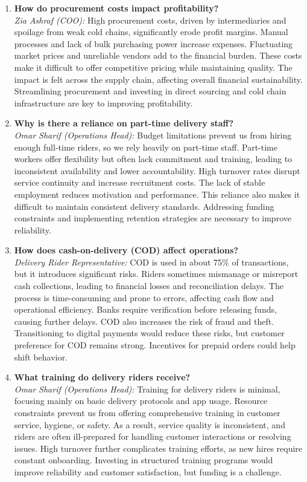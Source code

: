 \documentclass[12pt,a4paper]{article}
\begin{document}
\begin{enumerate}
        \item \textbf{How do procurement costs impact profitability?} \\
        \textit{Zia Ashraf (COO):} High procurement costs, driven by intermediaries and spoilage from weak cold chains, significantly erode profit margins. Manual processes and lack of bulk purchasing power increase expenses. Fluctuating market prices and unreliable vendors add to the financial burden. These costs make it difficult to offer competitive pricing while maintaining quality. The impact is felt across the supply chain, affecting overall financial sustainability. Streamlining procurement and investing in direct sourcing and cold chain infrastructure are key to improving profitability.

        \item \textbf{Why is there a reliance on part-time delivery staff?} \\
        \textit{Omar Sharif (Operations Head):} Budget limitations prevent us from hiring enough full-time riders, so we rely heavily on part-time staff. Part-time workers offer flexibility but often lack commitment and training, leading to inconsistent availability and lower accountability. High turnover rates disrupt service continuity and increase recruitment costs. The lack of stable employment reduces motivation and performance. This reliance also makes it difficult to maintain consistent delivery standards. Addressing funding constraints and implementing retention strategies are necessary to improve reliability.

        \item \textbf{How does cash-on-delivery (COD) affect operations?} \\
        \textit{Delivery Rider Representative:} COD is used in about 75\% of transactions, but it introduces significant risks. Riders sometimes mismanage or misreport cash collections, leading to financial losses and reconciliation delays. The process is time-consuming and prone to errors, affecting cash flow and operational efficiency. Banks require verification before releasing funds, causing further delays. COD also increases the risk of fraud and theft. Transitioning to digital payments would reduce these risks, but customer preference for COD remains strong. Incentives for prepaid orders could help shift behavior.

        \item \textbf{What training do delivery riders receive?} \\
        \textit{Omar Sharif (Operations Head):} Training for delivery riders is minimal, focusing mainly on basic delivery protocols and app usage. Resource constraints prevent us from offering comprehensive training in customer service, hygiene, or safety. As a result, service quality is inconsistent, and riders are often ill-prepared for handling customer interactions or resolving issues. High turnover further complicates training efforts, as new hires require constant onboarding. Investing in structured training programs would improve reliability and customer satisfaction, but funding is a challenge.


\end{enumerate}
\end{document}
